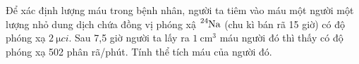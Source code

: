 \begin{ex}
	Để xác định lượng máu trong bệnh nhân, người ta tiêm vào máu một người một lượng nhỏ dung dịch chứa đồng vị phóng xậ $\ce{^{24}Na}$ (chu kì bán rã 15 giờ) có độ phóng xạ $\SI{2}{\micro ci}$. Sau 7,5 giờ người ta lấy ra $\SI{1}{\centi\meter^3}$ máu người đó thì thấy có độ phóng xạ 502 phân rã/phút. Tính thể tích máu của người đó.	
\end{ex}
